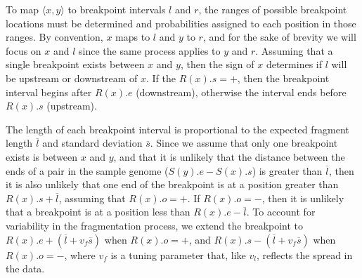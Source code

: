 \documentclass[11pt]{article}
\begin{document}

To map $\langle x,y \rangle$ to breakpoint intervals $l$ and $r$, the ranges of
possible breakpoint locations must be determined and probabilities assigned to
each position in those ranges.  By convention, $x$ maps to $l$ and $y$ to
$r$, and for the sake of brevity we will focus on $x$ and $l$ since the same
process applies to $y$ and $r$.  Assuming that a single breakpoint exists
between $x$ and $y$, then the sign of $x$ determines if $l$ will be upstream
or downstream of $x$.  If the $R(x).s=+$, then the breakpoint interval begins
after $R(x).e$ (downstream), otherwise the interval ends before $R(x).s$
(upstream).  

The length of each breakpoint interval is proportional to the expected fragment
length $\overline{l}$ and standard deviation $\overline{s}$.  Since we assume
that only one breakpoint exists is between $x$ and $y$, and that it is unlikely
that the distance between the ends of a pair in the sample genome ($S(y).e -
S(x).s$) is greater than $\overline{l}$, then it is also unlikely that one end
of the breakpoint is at a position greater than $R(x).s + \overline{l}$,
assuming that $R(x).o=+$. If $R(x).o=-$, then it is unlikely that a breakpoint
is at a position less than $R(x).e - \overline{l}$.  To account for variability
in the fragmentation process, we extend the breakpoint to 
$R(x).e + (\overline{l} + v_f\overline{s})$ when $R(x).o=+$, and 
$R(x).s - (\overline{l} + v_f\overline{s})$ when $R(x).o=-$, 
where $v_f$ is a tuning parameter that, like $v_l$, reflects the spread in the
data.
\end{document}
